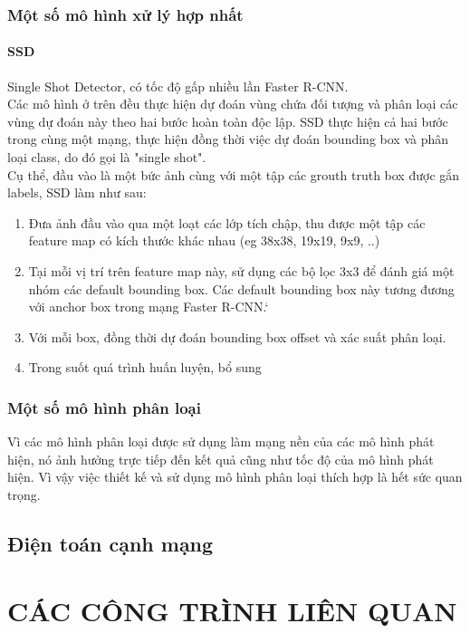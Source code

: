 \documentclass[a4paper]{report}
\begin{document}
\subsection{Một số mô hình xử lý hợp nhất}
\subsubsection{SSD}
Single Shot Detector, có tốc độ gấp nhiều lần Faster R-CNN. \\

Các mô hình ở trên đều thực hiện dự đoán vùng chứa đối tượng và phân loại các 
vùng dự đoán này theo hai bước hoàn toàn độc lập. SSD thực hiện cả hai bước trong
cùng một mạng, thực hiện đồng thời việc dự đoán bounding box và phân loại class,
 do đó gọi là "single shot".\\

Cụ thể, đầu vào là một bức ảnh cùng với một tập các grouth truth box được gắn labels, SSD làm như sau:
\begin{enumerate}
	\item Đưa ảnh đầu vào qua một loạt các lớp tích chập, thu được một tập các feature map có kích thước khác nhau (eg 38x38, 19x19, 9x9, ..)
	\item Tại mỗi vị trí trên feature map này, sử dụng các bộ lọc 3x3 để đánh giá một nhóm các default bounding box. Các default bounding box này tương đương với anchor box trong mạng Faster R-CNN.`
	\item Với mỗi box, đồng thời dự đoán bounding box offset và xác suất phân loại. 
	\item Trong suốt quá trình huấn luyện, bổ sung
\end{enumerate}

\subsection{Một số mô hình phân loại}
Vì các mô hình phân loại được sử dụng làm mạng nền của các mô hình phát hiện, nó ảnh hưởng trực tiếp đến kết quả cũng như tốc độ của mô hình phát hiện. Vì vậy việc thiết kế và sử dụng mô hình phân loại thích hợp là hết sức quan trọng. \\


\section{Điện toán cạnh mạng}

\chapter{CÁC CÔNG TRÌNH LIÊN QUAN }
\end{document}
